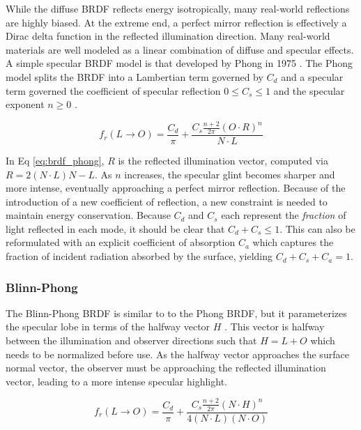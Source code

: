 While the diffuse BRDF reflects energy isotropically, many real-world reflections are highly biased. At the extreme end, a perfect mirror reflection is effectively a Dirac delta function in the reflected illumination direction. Many real-world materials are well modeled as a linear combination of diffuse and specular effects. A simple specular BRDF model is that developed by Phong in 1975 \cite{phong1975}. The Phong model splits the BRDF into a Lambertian term governed by $C_d$ and a specular term governed the coefficient of specular reflection $ 0 \leq C_s \leq 1$ and the specular exponent $n \geq 0$ \cite{duvenhage2013}. 

\begin{equation} \label{eq:brdf_phong}
  f_r(L \rightarrow O) = \frac{C_d}{\pi} + \frac{C_s \frac{n+2}{2\pi} (O \cdot R)^n}{N \cdot L}
\end{equation}

In Eq \ref{eq:brdf_phong}, $R$ is the reflected illumination vector, computed via $R = 2 (N \cdot L) N - L$. As $n$ increases, the specular glint becomes sharper and more intense, eventually approaching a perfect mirror reflection. Because of the introduction of a new coefficient of reflection, a new constraint is needed to maintain energy conservation. Because $C_d$ and $C_s$ each represent the \textit{fraction} of light reflected in each mode, it should be clear that $C_d + C_s \leq 1$. This can also be reformulated with an explicit coefficient of absorption $C_a$ which captures the fraction of incident radiation absorbed by the surface, yielding $C_d + C_s + C_a = 1$. 

\subsubsection{Blinn-Phong}

The Blinn-Phong BRDF is similar to to the Phong BRDF, but it parameterizes the specular lobe in terms of the halfway vector $H$ \cite{duvenhage2013}. This vector is halfway between the illumination and observer directions such that $H = L + O$ which needs to be normalized before use. As the halfway vector approaches the surface normal vector, the observer must be approaching the reflected illumination vector, leading to a more intense specular highlight. 

\begin{equation} \label{eq:brdf_blinn_phong}
  f_r(L \rightarrow O) = \frac{C_d}{\pi} + \frac{C_s \frac{n+2}{2\pi} (N \cdot H)^n}{4 (N \cdot L)(N \cdot O)}
\end{equation}

